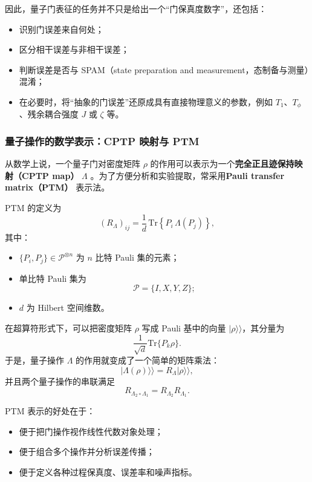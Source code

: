 \documentclass[12pt,a4paper,oneside]{ctexbook}
\begin{document}
因此，量子门表征的任务并不只是给出一个“门保真度数字”，还包括：
\begin{itemize}
    \item 识别门误差来自何处；
    \item 区分相干误差与非相干误差；
    \item 判断误差是否与 SPAM（state preparation and measurement，态制备与测量）混淆；
    \item 在必要时，将“抽象的门误差”还原成具有直接物理意义的参数，例如 \(T_1\)、\(T_\phi\)、残余耦合强度 \(J\) 或 \(\zeta\) 等。
\end{itemize}

\subsubsection{量子操作的数学表示：CPTP 映射与 PTM}

从数学上说，一个量子门对密度矩阵 \(\rho\) 的作用可以表示为一个\textbf{完全正且迹保持映射（CPTP map）} \(\Lambda\) \cite{placeholder}。为了方便分析和实验提取，常采用\textbf{Pauli transfer matrix（PTM）} 表示法。

PTM 的定义为
\begin{equation}
(R_\Lambda)_{ij}
=
\frac{1}{d}\,
\mathrm{Tr}\!\left\{
P_i\,\Lambda(P_j)
\right\},
\tag{69}
\end{equation}
其中：
\begin{itemize}
    \item \(\{P_i,P_j\}\in \mathcal{P}^{\otimes n}\) 为 \(n\) 比特 Pauli 集的元素；
    \item 单比特 Pauli 集为
    \[
    \mathcal{P}=\{I,X,Y,Z\};
    \]
    \item \(d\) 为 Hilbert 空间维数。
\end{itemize}

在超算符形式下，可以把密度矩阵 \(\rho\) 写成 Pauli 基中的向量 \(|\rho\rangle\rangle\)，其分量为
\[
\frac{1}{\sqrt d}\mathrm{Tr}\{P_k\rho\}.
\]
于是，量子操作 \(\Lambda\) 的作用就变成了一个简单的矩阵乘法：
\begin{equation}
|\Lambda(\rho)\rangle\rangle
=
R_\Lambda |\rho\rangle\rangle,
\tag{70}
\end{equation}
并且两个量子操作的串联满足
\begin{equation}
R_{\Lambda_2\circ \Lambda_1}
=
R_{\Lambda_2}R_{\Lambda_1}.
\tag{71}
\end{equation}

PTM 表示的好处在于：
\begin{itemize}
    \item 便于把门操作视作线性代数对象处理；
    \item 便于组合多个操作并分析误差传播；
    \item 便于定义各种过程保真度、误差率和噪声指标。
\end{itemize}
\end{document}

